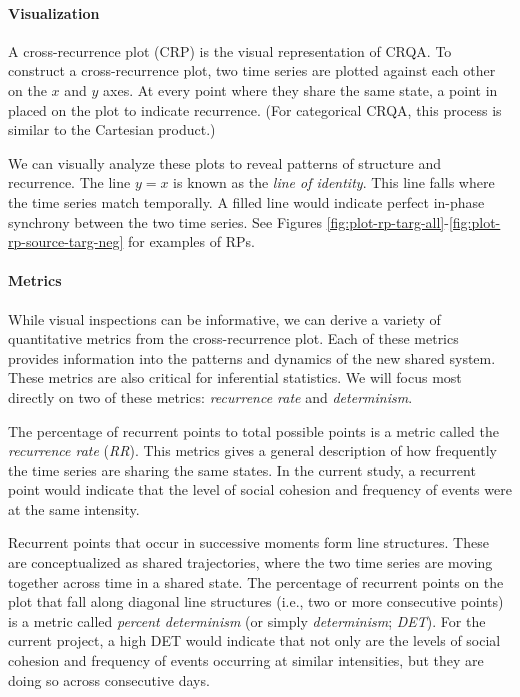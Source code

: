 \documentclass[
  english,
  man]{apa6}
\let\oldparagraph\paragraph
\renewcommand{\paragraph}[1]{\oldparagraph{#1}\mbox{}}
\begin{document}
\hypertarget{visualization}{%
\paragraph{Visualization}\label{visualization}}

A cross-recurrence plot (CRP) is the visual representation of CRQA. To construct
a cross-recurrence plot, two time series are plotted against each other on the
\(x\) and \(y\) axes. At every point where they share the same state, a point in
placed on the plot to indicate recurrence. (For categorical CRQA, this process
is similar to the Cartesian product.)

We can visually analyze these plots to reveal patterns of structure and
recurrence. The line \(y = x\) is known as the \emph{line of identity}. This line falls
where the time series match temporally. A filled line would indicate perfect
in-phase synchrony between the two time series. See Figures
\ref{fig:plot-rp-targ-all}-\ref{fig:plot-rp-source-targ-neg} for examples of
RPs.

\hypertarget{metrics}{%
\paragraph{Metrics}\label{metrics}}

While visual inspections can be informative, we can derive a variety of
quantitative metrics from the cross-recurrence plot. Each of these metrics
provides information into the patterns and dynamics of the new shared system.
These metrics are also critical for inferential statistics. We will focus most
directly on two of these metrics: \emph{recurrence rate} and \emph{determinism}.

The percentage of recurrent points to total possible points is a metric called
the \emph{recurrence rate} (\emph{RR}). This metrics gives a general description of how
frequently the time series are sharing the same states. In the current study, a
recurrent point would indicate that the level of social cohesion and frequency
of events were at the same intensity.

Recurrent points that occur in successive moments form line structures. These
are conceptualized as shared trajectories, where the two time series are moving
together across time in a shared state. The percentage of recurrent points on
the plot that fall along diagonal line structures (i.e., two or more consecutive
points) is a metric called \emph{percent determinism} (or simply \emph{determinism};
\emph{DET}). For the current project, a high DET would indicate that not only are the
levels of social cohesion and frequency of events occurring at similar
intensities, but they are doing so across consecutive days.
\end{document}
